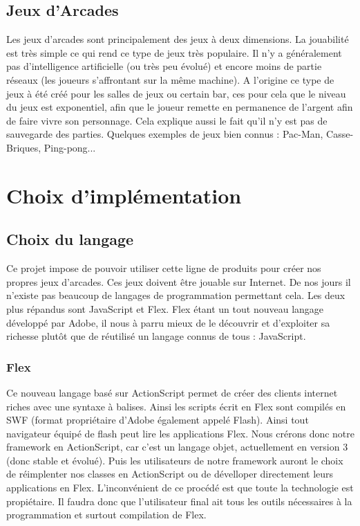 \documentclass{article}
\begin{document}
	\subsection{Jeux d'Arcades}
		Les jeux d'arcades sont principalement des jeux à deux dimensions. La jouabilité est très simple ce qui rend ce type de jeux très populaire. Il n'y a généralement pas d'intelligence artificielle (ou très peu évolué) et encore moins de partie réseaux (les joueurs s'affrontant sur la même machine).
		\ident A l'origine ce type de jeux à été créé pour les salles de jeux ou certain bar, ces pour cela que le niveau du jeux est exponentiel, afin que le joueur remette en permanence de l'argent afin de faire vivre son personnage. Cela explique aussi le fait qu'il n'y est pas de sauvegarde des parties.
		\ident Quelques exemples de jeux bien connus : Pac-Man, Casse-Briques, Ping-pong...

\newpage

\section{Choix d'implémentation}
	\subsection{Choix du langage}
		Ce projet impose de pouvoir utiliser cette ligne de produits pour créer nos propres jeux d'arcades. Ces jeux doivent être jouable sur Internet. De nos jours il n'existe pas beaucoup de langages de programmation permettant cela. Les deux plus répandus sont JavaScript et Flex. Flex étant un tout nouveau langage développé par Adobe, il nous à parru mieux de le découvrir et d'exploiter sa richesse plutôt que de réutilisé un langage connus de tous : JavaScript.
		\subsubsection{Flex}
			Ce nouveau langage basé sur ActionScript permet de créer des clients internet riches avec une syntaxe à balises. Ainsi les scripts écrit en Flex sont compilés en SWF (format propriétaire d'Adobe également appelé Flash). Ainsi tout navigateur équipé de flash peut lire les applications Flex.
			\ident Nous crérons donc notre framework en ActionScript, car c'est un langage objet, actuellement en version 3 (donc stable et évolué). Puis les utilisateurs de notre framework auront le choix de réimplenter nos classes en ActionScript ou de dévelloper directement leurs applications en Flex.
			\ident L'inconvénient de ce procédé est que toute la technologie est propiétaire. Il faudra donc que l'utilisateur final ait tous les outils nécessaires à la programmation et surtout compilation de Flex.
\end{document}
